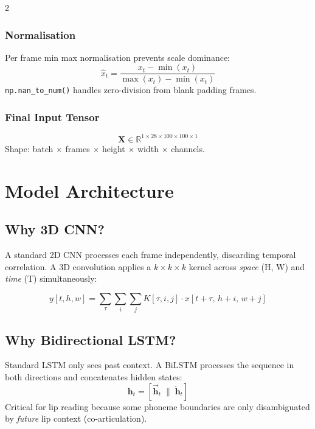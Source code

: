 \documentclass[10pt, a4paper]{article}
\begin{document}
\begin{multicols}{2}
\subsubsection{Normalisation}
Per frame min max normalisation prevents scale dominance:
\begin{equation}
\hat{x}_t = \frac{x_t - \min(x_t)}{\max(x_t) - \min(x_t)}
\end{equation}
\texttt{np.nan\_to\_num()} handles zero-division from blank padding frames.

\subsubsection{Final Input Tensor}
\begin{equation}
\mathbf{X} \in \mathbb{R}^{1 \times 28 \times 100 \times 100 \times 1}
\end{equation}
Shape: batch $\times$ frames $\times$ height $\times$ width $\times$ channels.

\columnbreak

\section{Model Architecture}

\subsection{Why 3D CNN?}
A standard 2D CNN processes each frame independently, discarding temporal
correlation. A 3D convolution applies a $k \times k \times k$ kernel across
\textit{space} (H, W) and \textit{time} (T) simultaneously:

\begin{equation}
y[t,h,w] = \sum_{\tau}\sum_{i}\sum_{j}
  K[\tau,i,j] \cdot x[t{+}\tau,\, h{+}i,\, w{+}j]
\end{equation}

\subsection{Why Bidirectional LSTM?}
Standard LSTM only sees past context. A BiLSTM processes the sequence
in both directions and concatenates hidden states:
\begin{equation}
\mathbf{h}_t = \left[\overrightarrow{\mathbf{h}}_t \;\|\; \overleftarrow{\mathbf{h}}_t\right]
\end{equation}
Critical for lip reading because some phoneme boundaries are only
disambiguated by \textit{future} lip context (co-articulation).


\end{multicols}
\end{document}
